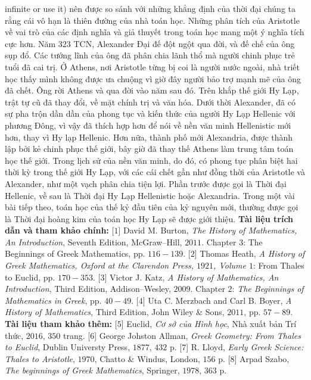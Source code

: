 \begin{multicols}{2}
	infinite or use it) nên được so sánh với những khẳng định của thời đại chúng ta rằng cái vô hạn là thiên đường của nhà toán học.  
	\vskip 0.1cm
	Những phân tích của Aristotle về vai trò của các định nghĩa và giả thuyết trong toán học mang một ý nghĩa tích cực hơn.
	\vskip 0.1cm
	Năm $323$ TCN, Alexander Đại đế đột ngột qua đời, và đế chế của ông sụp đổ. Các tướng lĩnh của ông đã phân chia lãnh thổ mà người chinh phục trẻ tuổi đã cai trị. Ở Athens, nơi Aristotle từng bị coi là người nước ngoài, nhà triết học thấy mình không được ưa chuộng vì giờ đây người bảo trợ mạnh mẽ của ông đã chết. Ông rời Athens và qua đời vào năm sau đó.
	\vskip 0.1cm
	Trên khắp thế giới Hy Lạp, trật tự cũ đã thay đổi, về mặt chính trị và văn hóa. 
	Dưới thời Alexander, đã có sự pha trộn dần dần của phong tục và kiến thức của người Hy Lạp Hellenic với phương Đông, vì vậy đã thích hợp hơn  để nói về nền văn minh Hellenistic mới hơn, thay vì Hy lạp Hellenic. 
	\vskip 0.1cm
	Hơn nữa, thành phố mới Alexandria, được thành lập bởi kẻ chinh phục thế giới, bây giờ đã thay thế Athens làm trung tâm toán học thế giới. 
	\vskip 0.1cm
	Trong lịch sử của nền văn minh, do đó, có phong tục phân biệt hai thời kỳ trong thế giới Hy Lạp, với các cái chết gần như đồng thời của Aristotle và Alexander, như một vạch phân chia tiện lợi. Phần trước được gọi là Thời đại Hellenic, về sau là Thời đại Hy Lạp Hellenistic hoặc Alexandria. Trong một vài bài tiếp theo, toán học của thế kỷ đầu tiên của kỷ nguyên mới, thường được gọi là Thời đại hoàng kim của toán học Hy Lạp sẽ được giới thiệu.
	\vskip 0.1cm
	\textbf{\color{lichsutoanhoc}Tài liệu trích dẫn và tham khảo chính:}
	\vskip 0.1cm
	[$1$] David M. Burton, \textit{The History of Mathematics, An Introduction}, Seventh Edition, McGraw--Hill, $2011$. Chapter $3$: The Beginnings of Greek Mathematics, pp. $116-139$.
	\vskip 0.1cm
	[$2$] Thomas Heath, \textit{A History of Greek Mathematics, Oxford at the Clarendon Press, $1921$, Volume $1$}: From Thales to Euclid, pp. $170-353$.
	\vskip 0.1cm   
	[$3$] Victor J. Katz, \textit{A History of Mathematics, An Introduction}, Third Edition, Addison--Wesley, $2009$. Chapter $2$: \textit{The Beginnings of Mathematics in Greek}, pp. $40-49$.
	\vskip 0.1cm
	[$4$] Uta C. Merzbach and Carl B. Boyer, \textit{A
	History of Mathematics}, Third Edition, John Wiley \& Sons, $2011$, pp. $57-89$.
	\vskip 0.1cm
	\textbf{\color{lichsutoanhoc}Tài liệu tham khảo thêm:}
	\vskip 0.1cm
	[$5$]  Euclid, \textit{Cơ sở của Hình học}, Nhà xuất bản Trí thức, $2016$, $350$ trang.
	\vskip 0.1cm
	[$6$] George Johston Allman, \textit{Greek Geometry: From Thales to Euclid}, Dublin Universty Press, $1877$, $432$ p.
	\vskip 0.1cm  
	[$7$] R. Lloyd, \textit{Early Greek Science: Thales to Aristotle}, $1970$, Chatto \& Windus, London, $156$ p. 
	\vskip 0.1cm
	[$8$] Arpad Szabo, \textit{The beginnings of Greek Mathematics}, Springer, $1978$, $363$ p.
\end{multicols}
